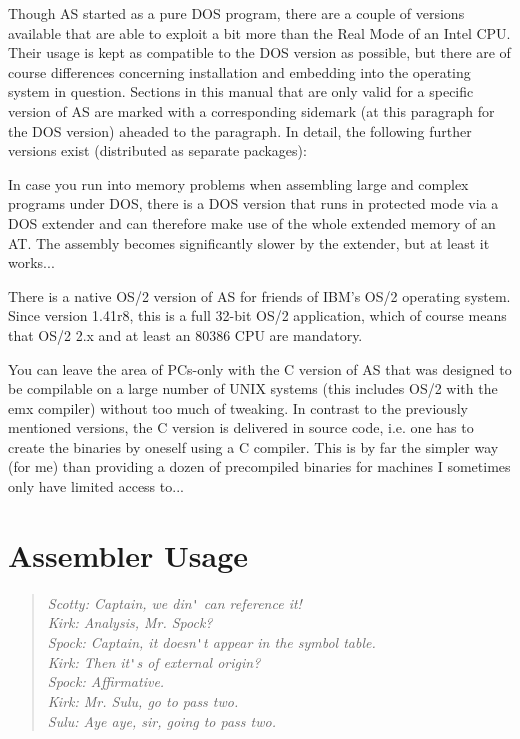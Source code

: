 \documentclass[12pt,twoside]{report}
\begin{document}
Though AS started as a pure DOS  program, there are a
couple of versions available that are able to exploit a bit more than the
Real Mode of an Intel CPU.  Their usage is kept as compatible to the DOS
version as possible, but there are of course differences concerning
installation and embedding into the operating system in question.
Sections in this manual that are only valid for a specific version of AS
are marked with a corresponding sidemark (at this paragraph for the DOS
version) aheaded to the paragraph.  In detail, the following further
versions exist (distributed as separate packages):

In case you run into memory problems when assembling
large and complex programs under DOS, there is a DOS version that runs in
protected mode via a DOS extender and can therefore make use of the whole
extended memory of an AT.  The assembly becomes significantly slower by
the extender, but at least it works...

There is a native OS/2  version of AS for friends of
IBM's OS/2 operating system.  Since version 1.41r8, this is a full 32-bit
OS/2 application, which of course means that OS/2 2.x and at least an
80386 CPU are mandatory.

You can leave  the area of PCs-only with the C
version of AS that was designed to be compilable on a large number of UNIX
systems (this includes OS/2 with the emx compiler) without too much of
tweaking.  In contrast to the previously mentioned versions, the C version
is delivered in source code, i.e. one has to create the binaries by
oneself using a C compiler.  This is by far the simpler way (for me) than
providing a dozen of precompiled binaries for machines I sometimes only
have limited access to...


\cleardoublepage
\chapter{Assembler Usage}

\begin{quote}\begin{raggedright}{\it
Scotty: Captain, we din\verb!'! can reference it! \\
Kirk:   Analysis, Mr. Spock? \\
Spock:  Captain, it doesn\verb!'!t appear in the symbol table. \\
Kirk:   Then it\verb!'!s of external origin? \\
Spock:  Affirmative. \\
Kirk:   Mr. Sulu, go to pass two. \\
Sulu:   Aye aye, sir, going to pass two. \\
}\end{raggedright}\end{quote}
\end{document}
